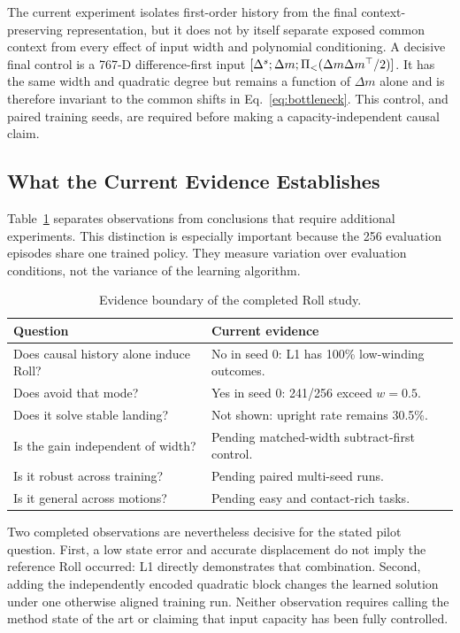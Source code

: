 The current experiment isolates first-order history from the final
context-preserving representation, but it does not by itself separate exposed
common context from every effect of input width and polynomial conditioning.
A decisive final control is a 767-D difference-first input
$[\Delta^s;\Delta m;\Pi_{<}(\Delta m\Delta m^\top/2)]$.  It has the same width and
quadratic degree but remains a function of $\Delta m$ alone and is therefore
invariant to the common shifts in Eq.~\eqref{eq:bottleneck}.  This control, and
paired training seeds, are required before making a capacity-independent
causal claim.

\subsection{What the Current Evidence Establishes}

Table~\ref{tab:evidence} separates observations from conclusions that require
additional experiments.  This distinction is especially important because
the 256 evaluation episodes share one trained policy.  They measure variation
over evaluation conditions, not the variance of the learning algorithm.

\begin{table}[!t]
\centering
\caption{Evidence boundary of the completed Roll study.}
\label{tab:evidence}
\begin{tabular}{>{\raggedright\arraybackslash}p{}%
                >{\raggedright\arraybackslash}p{}}
\toprule
Question & Current evidence\\
\midrule
Does causal history alone induce Roll? & No in seed 0: L1 has 100\% low-winding outcomes.\\
Does \ours{} avoid that mode? & Yes in seed 0: 241/256 exceed $w=0.5$.\\
Does it solve stable landing? & Not shown: upright rate remains 30.5\%.\\
Is the gain independent of width? & Pending matched-width subtract-first control.\\
Is it robust across training? & Pending paired multi-seed runs.\\
Is it general across motions? & Pending easy and contact-rich tasks.\\
\bottomrule
\end{tabular}
\end{table}

Two completed observations are nevertheless decisive for the stated pilot
question.  First, a low state error and accurate displacement do not imply the
reference Roll occurred: L1 directly demonstrates that combination.  Second,
adding the independently encoded quadratic block changes the learned solution
under one otherwise aligned training run.  Neither observation requires
calling the method state of the art or claiming that input capacity has been
fully controlled.

